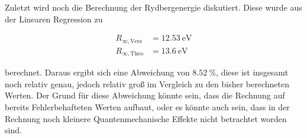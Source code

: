     \noindent Zuletzt wird noch die Berechnung der Rydbergenergie diskutiert. Diese wurde aus der Linearen Regression zu 

    \begin{align*}
        R_{\infty, \text{Vers}} &= \SI{12.53}{\electronvolt}\\
        R_{\infty, \text{Theo}} &= \SI{13.6}{\electronvolt}
    \end{align*}

    \noindent berechnet. Daraus ergibt sich eine Abweichung von $\SI{8.52}{\percent}$, diese ist insgesamt noch relativ genau, jedoch relativ groß 
    im Vergleich zu den bisher berechneten Werten. Der Grund für diese Abweichung könnte sein, dass die Rechnung auf bereits Fehlerbehafteten 
    Werten aufbaut, oder es könnte auch sein, dass in der Rechnung noch kleinere Quantenmechanische Effekte nicht betrachtet worden sind.
    
    

    
    